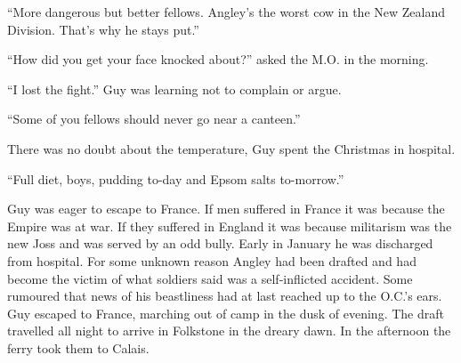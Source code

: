 ``More dangerous but better fellows. Angley's the worst 
cow in the New Zealand Division. That's why he stays put.''

``How did you get your face knocked about?'' asked the M.O. in the 
morning.

``I lost the fight.'' Guy was learning not to complain or argue.

``Some of you fellows should never go near a canteen.''

There was no doubt about the temperature, Guy spent the 
Christmas in hospital.

``Full diet, boys, pudding to-day and Epsom salts to-morrow.''

Guy was eager to escape to France. If men suffered in France 
it was because the Empire was at war. If they suffered in 
England it was because militarism was the new Joss and was 
served by an odd bully. Early in January he was discharged 
from hospital. For some unknown reason Angley had been 
drafted and had become the victim of what soldiers said was 
a self-inflicted accident. Some rumoured that news of his 
beastliness had at last reached up to the O.C.'s ears. Guy 
escaped to France, marching out of camp in the dusk of 
evening. The draft travelled all night to arrive in Folkstone 
in the dreary dawn. In the afternoon the ferry took them 
to Calais.